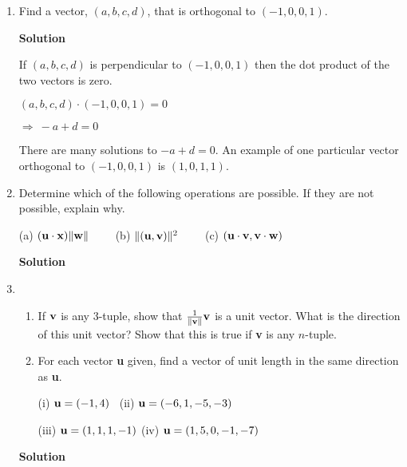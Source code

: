 \begin{enumerate}
\item Find a vector, $(a,b,c,d)$, that is orthogonal to
$(-1,0,0,1)$.

\noindent \textbf{Solution}

\noindent If $(a,b,c,d)$ is perpendicular to $(-1,0,0,1)$ then the
dot product of the two vectors is zero.

$(a,b,c,d) \cdot (-1,0,0,1)=0$

$\Rightarrow\ -a+d=0$

\noindent There are many solutions to $-a+d=0$. An example of one
particular vector orthogonal to $(-1,0,0,1)$ is $(1,0,1,1)$.

\item Determine which of the following operations are possible. If
they are not possible, explain why.

(a) $({\bf u} \cdot {\bf x}) \| {\bf w} \| \quad \quad$ (b) $\|
({\bf u} , {\bf v}) \|^2 \quad \quad$ (c) $({\bf u} \cdot {\bf
v},{\bf v} \cdot {\bf w})$

\noindent \textbf{Solution} 
\item
\begin{enumerate}
\item If ${\bf v}$ is any 3-tuple, show that $\frac{1}{\bf \|v\|}{\bf
v}$ is a unit vector. What is the direction of this unit vector?
Show that this is true if {\bf v} is any $n$-tuple.
\item For each vector {\bf u} given, find a vector of unit length in the
same direction as {\bf u}.

(i) ${\bf u}=(-1,4)$ \quad \quad \quad\quad\,\,\,(ii) ${\bf u}=(-6,1,-5,-3)$ \quad
\quad

(iii) ${\bf u}=(1,1,1,-1)$ \quad \quad (iv) ${\bf
u}=(1,5,0,-1,-7)$
\end{enumerate}

\noindent \textbf{Solution} 
\end{enumerate}
